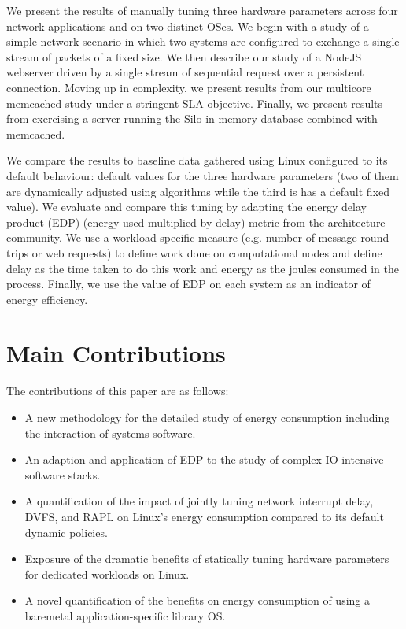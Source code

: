 \documentclass[pageno]{jpaper}
\begin{document}
We present the results of manually tuning three hardware parameters across four network applications and on two distinct OSes.
We begin with a study of a simple network scenario in which two systems are configured to exchange a single stream of packets of a fixed size.  We then describe our study of a NodeJS webserver driven by a single stream of sequential request over a persistent connection.  Moving up in complexity, we present results from our multicore memcached study under a stringent SLA objective. Finally, we present results from exercising a server running the Silo in-memory database combined with memcached.

We compare the results to baseline data gathered using Linux configured to its default behaviour: default values for the three hardware parameters (two of them are  dynamically adjusted using algorithms while the third is has a default fixed value).
We evaluate and compare this tuning by adapting the energy delay product (EDP) (energy used multiplied by delay) metric from the architecture community.
We use a workload-specific measure (e.g. number of message round-trips or web requests) to define work done on computational nodes and define delay as the time taken to do this work and energy as the joules consumed in the process.
Finally, we use the value of EDP on each system as an indicator of energy efficiency.

\section{Main Contributions}

The contributions of this paper are as follows:
\begin{itemize}
    \item A new methodology for the detailed study of energy consumption including the interaction of systems software.
    \item An adaption and application of EDP to the study of complex IO intensive software stacks.
    \item A quantification of the impact of jointly tuning network interrupt delay, DVFS, and RAPL on Linux's energy consumption compared to its default dynamic policies.
    \item Exposure of the dramatic benefits of statically tuning hardware parameters for dedicated workloads on Linux.
    \item A novel quantification of the benefits on energy consumption of using a baremetal application-specific library OS.
\end{itemize}
\end{document}
